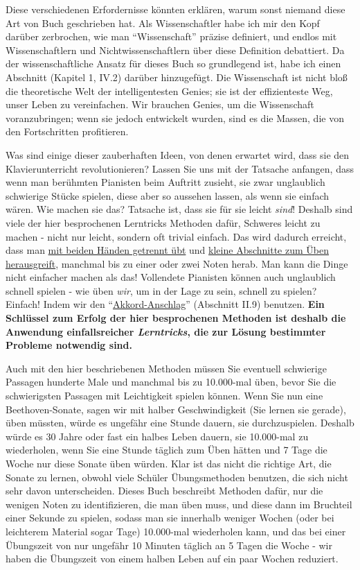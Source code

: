  Diese verschiedenen Erfordernisse könnten erklären, warum sonst niemand diese Art von Buch geschrieben hat.
 Als Wissenschaftler habe ich mir den Kopf darüber zerbrochen, wie man \enquote{Wissenschaft} präzise definiert, und endlos mit Wissenschaftlern und Nichtwissenschaftlern über diese Definition debattiert.
 Da der wissenschaftliche Ansatz für dieses Buch so grundlegend ist, habe ich einen Abschnitt (Kapitel 1, IV.2) darüber hinzugefügt.
 Die Wissenschaft ist nicht bloß die theoretische Welt der intelligentesten Genies; sie ist der effizienteste Weg, unser Leben zu vereinfachen.
 Wir brauchen Genies, um die Wissenschaft voranzubringen; wenn sie jedoch entwickelt wurden, sind es die Massen, die von den Fortschritten profitieren.
 

Was sind einige dieser zauberhaften Ideen, von denen erwartet wird, dass sie den Klavierunterricht revolutionieren?
 Lassen Sie uns mit der Tatsache anfangen, dass wenn man berühmten Pianisten beim Auftritt zusieht, sie zwar unglaublich schwierige Stücke spielen, diese aber so aussehen lassen, als wenn sie einfach wären.
 Wie machen sie das?
 Tatsache ist, dass sie für sie leicht \textit{sind}!
 Deshalb sind viele der hier besprochenen Lerntricks Methoden dafür, Schweres leicht zu machen - nicht nur leicht, sondern oft trivial einfach.
 Das wird dadurch erreicht, dass man \hyperlink{c1ii7}{mit beiden Händen getrennt übt} und \hyperlink{c1ii6}{kleine Abschnitte zum Üben herausgreift}, manchmal bis zu einer oder zwei Noten herab.
 Man kann die Dinge nicht einfacher machen als das!
 Vollendete Pianisten können auch unglaublich schnell spielen - wie üben \textit{wir}, um in der Lage zu sein, schnell zu spielen?
 Einfach!
 Indem wir den \enquote{\hyperlink{c1ii9}{Akkord-Anschlag}} (Abschnitt II.9) benutzen.
 \textbf{Ein Schlüssel zum Erfolg der hier besprochenen Methoden ist deshalb die Anwendung einfallsreicher \textit{Lerntricks}, die zur Lösung bestimmter Probleme notwendig sind.}

Auch mit den hier beschriebenen Methoden müssen Sie eventuell schwierige Passagen hunderte Male und manchmal bis zu 10.000-mal üben, bevor Sie die schwierigsten Passagen mit Leichtigkeit spielen können.
 Wenn Sie nun eine Beethoven-Sonate, sagen wir mit halber Geschwindigkeit (Sie lernen sie gerade), üben müssten, würde es ungefähr eine Stunde dauern, sie durchzuspielen.
 Deshalb würde es 30 Jahre oder fast ein halbes Leben dauern, sie 10.000-mal zu wiederholen, wenn Sie eine Stunde täglich zum Üben hätten und 7 Tage die Woche nur diese Sonate üben würden.
 Klar ist das nicht die richtige Art, die Sonate zu lernen, obwohl viele Schüler Übungsmethoden benutzen, die sich nicht sehr davon unterscheiden.
 Dieses Buch beschreibt Methoden dafür, nur die wenigen Noten zu identifizieren, die man üben muss, und diese dann im Bruchteil einer Sekunde zu spielen, sodass man sie innerhalb weniger Wochen (oder bei leichterem Material sogar Tage) 10.000-mal wiederholen kann, und das bei einer Übungszeit von nur ungefähr 10 Minuten täglich an 5 Tagen die Woche - wir haben die Übungszeit von einem halben Leben auf ein paar Wochen reduziert.
 

